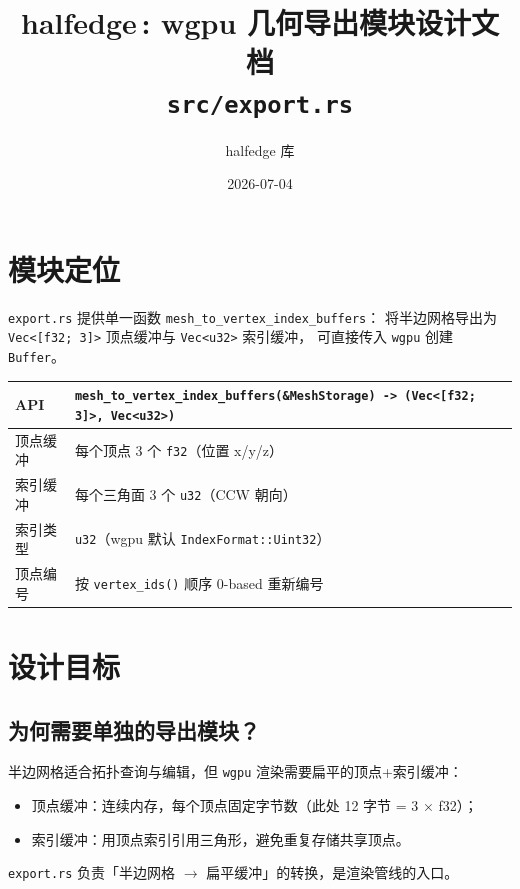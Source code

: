 \documentclass[11pt,a4paper]{article}
\title{\textbf{halfedge\,: wgpu 几何导出模块设计文档} \\ \large \texttt{src/export.rs}}
\author{halfedge 库}
\date{2026-07-04}
\begin{document}
\maketitle
\tableofcontents

\section{模块定位}

\texttt{export.rs} 提供单一函数 \texttt{mesh\_to\_vertex\_index\_buffers}：
将半边网格导出为 \texttt{Vec<[f32; 3]>} 顶点缓冲与 \texttt{Vec<u32>} 索引缓冲，
可直接传入 \texttt{wgpu} 创建 \texttt{Buffer}。

\begin{center}
\renewcommand{\arraystretch}{1.18}
\begin{tabular}{@{}ll@{}}
  \toprule
  \textbf{API} & \texttt{mesh\_to\_vertex\_index\_buffers(\&MeshStorage) -> (Vec<[f32; 3]>, Vec<u32>)} \\
  \midrule
  顶点缓冲 & 每个顶点 3 个 \texttt{f32}（位置 x/y/z） \\
  索引缓冲 & 每个三角面 3 个 \texttt{u32}（CCW 朝向） \\
  索引类型 & \texttt{u32}（wgpu 默认 \texttt{IndexFormat::Uint32}） \\
  顶点编号 & 按 \texttt{vertex\_ids()} 顺序 0-based 重新编号 \\
  \bottomrule
\end{tabular}
\end{center}

\section{设计目标}

\subsection{为何需要单独的导出模块？}

半边网格适合拓扑查询与编辑，但 \texttt{wgpu} 渲染需要扁平的顶点+索引缓冲：
\begin{itemize}
  \item 顶点缓冲：连续内存，每个顶点固定字节数（此处 12 字节 = 3 × f32）；
  \item 索引缓冲：用顶点索引引用三角形，避免重复存储共享顶点。
\end{itemize}

\texttt{export.rs} 负责「半边网格 $\to$ 扁平缓冲」的转换，是渲染管线的入口。
\end{document}
